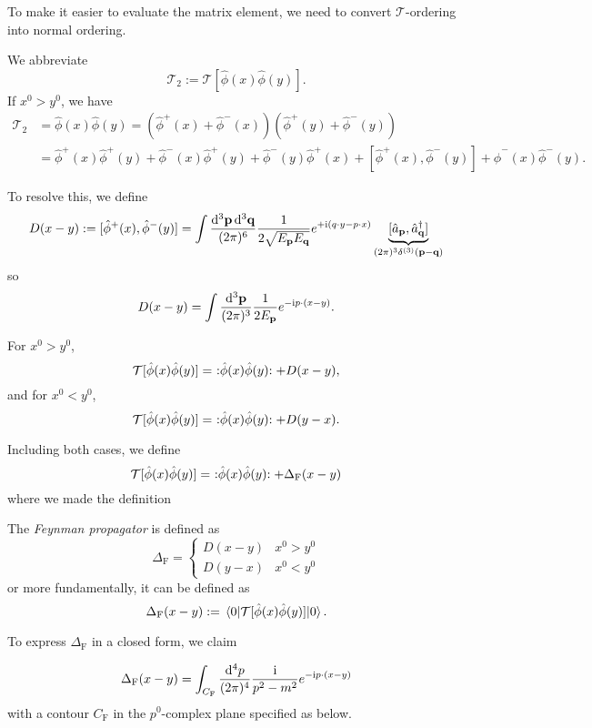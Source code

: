 \documentclass[a4paper,11pt]{article}
\begin{document}
	To make it easier to evaluate the matrix element, we need to convert $\mathcal{T}$-ordering into normal ordering.

	We abbreviate
	\[
		\mathcal{T}_2 := \mathcal{T}[\hat \phi(x) \hat \phi(y)].
	\]
	If $x^0 > y^0$, we have
	\begin{align*}
		\mathcal{T}_2 & = \hat \phi(x) \hat \phi(y) = \left( \hat \phi^+(x) + \hat \phi^-(x) \right) \left( \hat \phi^+(y) + \hat \phi^-(y) \right) \\
		& = \hat \phi^+(x)\hat \phi^+(y) + \hat \phi^-(x) \hat \phi^+(y) + \hat \phi^-(y)\hat \phi^+(x) + [\hat \phi^+(x), \hat \phi^-(y)] + \hat \phi^-(x)\hat \phi^-(y).
	\end{align*}
	
	To resolve this, we define
	\[
		D(x-y) := [\hat \phi^+(x), \hat \phi^-(y)] = \int \frac{\dd[3]{\vb p}\dd[3]{\vb q}}{(2 \pi)^6} \frac{1}{2 \sqrt{E _{\vb p}E _{\vb q}}} e^{+\mathrm{i}(q \cdot y - p \cdot x)} \underbrace{[\hat a _{\vb p}, \hat a^{\dagger} _{\vb q}]}_{(2 \pi)^3 \delta ^{(3)}(\vb p - \vb q)}
	\]
	so
	\begin{equation}
		D(x-y) = \int \frac{\dd[3]{\vb p}}{(2\pi)^{3}} \frac{1}{2 E _{\vb p}} e ^{- \mathrm{i}p \cdot(x - y)}.
		\label{eq:3.2.2}
	\end{equation}

	For $x^0 > y^0$,
	\[
		\mathcal{T}[\hat \phi(x)\hat \phi(y)] =\ \nord{\hat \phi(x)\hat \phi(y)} + D(x-y),
	\]
	and for $x^0 < y^0$,
	\[
		\mathcal{T}[\hat \phi(x)\hat \phi(y)] =\ \nord{\hat \phi(x)\hat \phi(y)} + D(y-x).
	\]

	Including both cases, we define
	\[
		\mathcal{T}[\hat \phi(x)\hat \phi(y)] =\ \nord{\hat \phi(x)\hat \phi(y)} + \Delta_\text{F}(x-y)
	\]
	where we made the definition
	\begin{defi}
		The \emph{Feynman propagator} is defined as 
		\[
			\Delta _{\text{F}} = \begin{cases}
				D(x-y) & x^0 > y^0\\
				D(y-x) & x^0 < y^0
			\end{cases}
		\]
		or more fundamentally, it can be defined as 
		\begin{equation}
			\Delta_\text{F}(x-y) := \mel{0}{\mathcal{T}[\hat \phi(x)\hat \phi(y)]}{0}.
			\label{eq:3.2.3}
		\end{equation}
	\end{defi}

	To express $\Delta_\text{F}$ in a closed form, we claim
	\begin{clm}
		\begin{equation}
			\Delta_\text{F} (x-y) = \int _{C_\text{F}} \frac{\dd[4]{p}}{(2\pi)^{4}} \frac{\mathrm{i}}{p^2 - m^2} e ^{-\mathrm{i} p \cdot(x-y)}
		\end{equation}
		with a contour $C_\text{F}$ in the $p^0$-complex plane specified as below.
	\end{clm}
	
\end{document}
